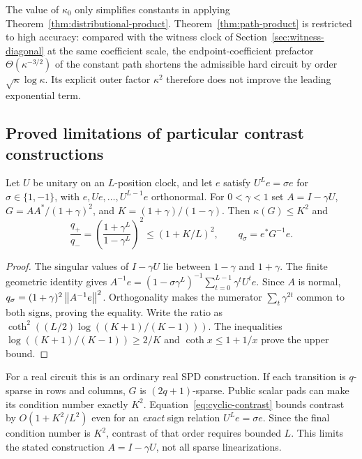 The value of $\kappa_0$ only simplifies constants in applying
Theorem~\ref{thm:distributional-product}.
Theorem~\ref{thm:path-product} is restricted to high accuracy: compared
with the witness clock of Section~\ref{sec:witness-diagonal} at the same
coefficient scale, the endpoint-coefficient prefactor
$\Theta(\kappa^{-3/2})$ of the constant path shortens the admissible hard
circuit by order $\sqrt\kappa\log\kappa$. Its explicit outer factor
$\kappa^2$ therefore does not improve the leading exponential term.

\subsection{Proved limitations of particular contrast constructions}
\begin{proposition}\label{prop:cyclic-dilution}
Let $U$ be unitary on an $L$-position clock, and let $e$ satisfy
$U^Le=\sigma e$ for $\sigma\in\{1,-1\}$, with
$e,Ue,\ldots,U^{L-1}e$ orthonormal. For $0<\gamma<1$ set
$A=I-\gamma U$, $G=AA^*/(1+\gamma)^2$, and
$K=(1+\gamma)/(1-\gamma)$. Then $\kappa(G)\leq K^2$ and
\begin{equation}\label{eq:cyclic-contrast}
 \frac{q_+}{q_-}
 =\left(\frac{1+\gamma^L}{1-\gamma^L}\right)^2
 \leq(1+K/L)^2,
 \qquad q_\sigma=e^*G^{-1}e.
\end{equation}
\end{proposition}
\begin{proof}
The singular values of $I-\gamma U$ lie between $1-\gamma$ and
$1+\gamma$. The finite geometric identity gives
$A^{-1}e=(1-\sigma\gamma^L)^{-1}\sum_{t=0}^{L-1}\gamma^tU^te$.
Since $A$ is normal, $q_\sigma=(1+\gamma)^2\left\lVert A^{-1}e\right\rVert^2$.
Orthogonality makes the numerator $\sum_t\gamma^{2t}$ common to
both signs, proving the equality. Write the ratio as
$\coth^2((L/2)\log((K+1)/(K-1)))$. The inequalities
$\log((K+1)/(K-1))\geq2/K$ and
$\coth x\leq1+1/x$ prove the upper bound.
\end{proof}
For a real circuit this is an ordinary real SPD construction. If each
transition is $q$-sparse in rows and columns, $G$ is $(2q+1)$-sparse.
Public scalar pads can make its condition number exactly $K^2$.
Equation~\eqref{eq:cyclic-contrast} bounds contrast by
$O(1+K^2/L^2)$ even for an \emph{exact} sign relation $U^Le=\sigma e$.
Since the final condition number is $K^2$, contrast of that order
requires bounded $L$. This limits the stated construction
$A=I-\gamma U$, not all sparse linearizations.

